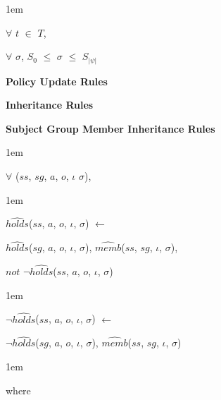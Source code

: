\documentclass[11pt]{report}
\newenvironment{vquote}
{
  \begin{list}{}{\leftmargin 1em}\item[]
}
{
  \end{list}
}
\begin{document}
\begin{itemize}
\begin{vquote}
                \hspace{1em}
                $\forall$ $t$ $\in$ $T$,

                \hspace{1em}
                $\forall$ $\sigma$, $S_{0}$ $\leq$ $\sigma$ $\leq$ $S_{|\psi|}$
              \end{vquote}
            
            \item
              {\bf Policy Update Rules}
            
            \item
              {\bf Inheritance Rules}

                \begin{itemize}
                  \item
                    {\bf Subject Group Member Inheritance Rules}

                    \begin{vquote}
                      $\forall$ ($ss$, $sg$, $a$, $o$, $\iota$ $\sigma$),
                    \end{vquote}
                   
                    \begin{vquote}
                      $\hat{holds}$($ss$, $a$, $o$, $\iota$, $\sigma$)
                      $\leftarrow$

                      \hspace{1em}
                      $\hat{holds}$($sg$, $a$, $o$, $\iota$, $\sigma$),
                      $\hat{memb}$($ss$, $sg$, $\iota$, $\sigma$),

                      \hspace{1em}
                      $not$ $\lnot\hat{holds}$($ss$, $a$, $o$, $\iota$, $\sigma$)
                    \end{vquote}
                   
                    \begin{vquote}
                      $\lnot\hat{holds}$($ss$, $a$, $o$, $\iota$, $\sigma$)
                      $\leftarrow$

                      \hspace{1em}
                      $\lnot\hat{holds}$($sg$, $a$, $o$, $\iota$, $\sigma$),
                      $\hat{memb}$($ss$, $sg$, $\iota$, $\sigma$)
                    \end{vquote}
                   
                    \begin{vquote}
                      where
                   

\end{vquote}
\end{itemize}
\end{itemize}
\end{document}

